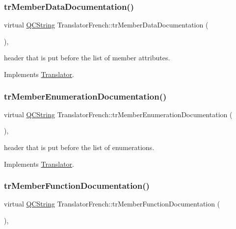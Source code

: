 \subsubsection{\texorpdfstring{trMemberDataDocumentation()}{trMemberDataDocumentation()}}
{\footnotesize\ttfamily virtual \mbox{\hyperlink{class_q_c_string}{Q\+C\+String}} Translator\+French\+::tr\+Member\+Data\+Documentation (\begin{DoxyParamCaption}{ }\end{DoxyParamCaption})\hspace{0.3cm}{\ttfamily [inline]}, {\ttfamily [virtual]}}

header that is put before the list of member attributes. 

Implements \mbox{\hyperlink{class_translator}{Translator}}.

\mbox{\label{class_translator_french_abc6337ec30c7b19ed8b0f598fe383e14}} 
\subsubsection{\texorpdfstring{trMemberEnumerationDocumentation()}{trMemberEnumerationDocumentation()}}
{\footnotesize\ttfamily virtual \mbox{\hyperlink{class_q_c_string}{Q\+C\+String}} Translator\+French\+::tr\+Member\+Enumeration\+Documentation (\begin{DoxyParamCaption}{ }\end{DoxyParamCaption})\hspace{0.3cm}{\ttfamily [inline]}, {\ttfamily [virtual]}}

header that is put before the list of enumerations. 

Implements \mbox{\hyperlink{class_translator}{Translator}}.

\mbox{\label{class_translator_french_a7141fc6dfb95c147c8655266f7c7fe10}} 
\subsubsection{\texorpdfstring{trMemberFunctionDocumentation()}{trMemberFunctionDocumentation()}}
{\footnotesize\ttfamily virtual \mbox{\hyperlink{class_q_c_string}{Q\+C\+String}} Translator\+French\+::tr\+Member\+Function\+Documentation (\begin{DoxyParamCaption}{ }\end{DoxyParamCaption})\hspace{0.3cm}{\ttfamily [inline]}, {\ttfamily [virtual]}}

